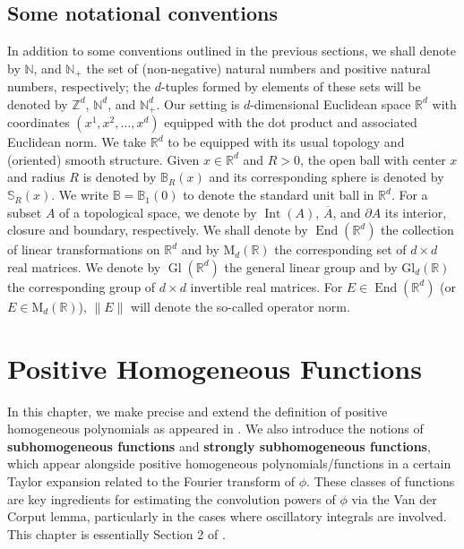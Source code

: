 \documentclass[11pt, letter]{book}
\newcommand\MdR{\mbox{M}_d(\mathbb{R})} %
\newcommand\End{\operatorname{End}} %
\newcommand\GldR{\mbox{Gl}_d(\mathbb{R})}%
\newcommand\Gl{\operatorname{Gl}} %
\newcommand\Interior{\operatorname{Int}}
\begin{document}
\section{Some notational conventions}
In addition to some conventions outlined in the previous sections, we shall denote by $\mathbb{N}$, and $\mathbb{N}_+$ the set of (non-negative) natural numbers and positive natural numbers, respectively; the $d$-tuples formed by elements of these sets will be denoted by $\mathbb{Z}^d$, $\mathbb{N}^d$, and $\mathbb{N}_+^d$. 
Our setting is $d$-dimensional Euclidean space $\mathbb{R}^d$ with coordinates $(x^1,x^2,\dots,x^d)$ equipped with the dot product and associated Euclidean norm. We take $\mathbb{R}^d$ to be equipped with its usual topology and (oriented) smooth structure. Given $x\in\mathbb{R}^d$ and $R>0$, the open ball with center $x$ and radius $R$ is denoted by $\mathbb{B}_R(x)$ and its corresponding sphere is denoted by $\mathbb{S}_R(x)$. We write $\mathbb{B}=\mathbb{B}_1(0)$ to denote the standard unit ball in $\mathbb{R}^d$. For a subset $A$ of a topological space, we denote by $\Interior{(A)}$, $\overline{A}$, and $\partial A$ its interior, closure and boundary, respectively. We shall denote by $\End(\mathbb{R}^d)$ the collection of linear transformations on $\mathbb{R}^d$ and by $\MdR$ the corresponding set of $d\times d$ real matrices. We denote by $\Gl(\mathbb{R}^d)$ the general linear group and by $\GldR$ the corresponding group of $d\times d$ invertible real matrices. For $E\in \End(\mathbb{R}^d)$ (or $E\in\MdR$), $\|E\|$ will denote the so-called operator norm.







\chapter{Positive Homogeneous Functions}\label{chap:pos-hom-fns}

In this chapter, we make precise and extend the definition of positive homogeneous polynomials as appeared in \cite{randles_convolution_2017}. We also introduce the notions of \textbf{subhomogeneous functions} and \textbf{strongly subhomogeneous functions}, which appear alongside positive homogeneous polynomials/functions in a certain Taylor expansion related to the Fourier transform of $\phi$. These classes of functions are key ingredients for estimating the convolution powers of $\phi$ via the Van der Corput lemma, particularly in the cases where oscillatory integrals are involved. This chapter is essentially Section 2 of \cite{bui2021generalized}.\\
\end{document}
